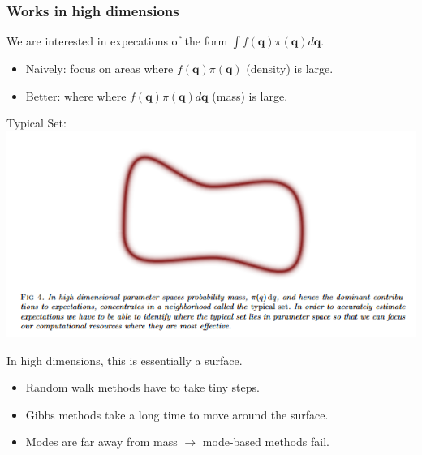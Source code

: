\documentclass[xcolor=dvipsnames]{beamer}
\begin{document}
\begin{frame}
\frametitle{Works in high dimensions}
We are interested in expecations of the form $\int f(\bm{q})\pi(\bm{q})d\bm{q}$.
\begin{itemize}
\item Naively: focus on areas where $f(\bm{q})\pi(\bm{q})$ (density) is large.
\item Better: where where $f(\bm{q})\pi(\bm{q})d\bm{q}$ (mass) is large.
\end{itemize}
\begin{center}
Typical Set:\\
\includegraphics[height=0.4\textheight]{typicalset.png}
\end{center}
In high dimensions, this is essentially a surface.
\begin{itemize}
\item Random walk methods have to take tiny steps.
\item Gibbs methods take a long time to move around the surface.
\item Modes are far away from mass $\to$ mode-based methods fail.
\end{itemize}
\end{frame}
\end{document}
